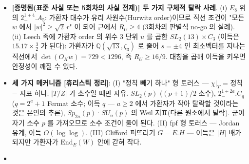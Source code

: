 \begin{itemize}
  \textbf{{[}계산{]} GAP 지표표 라이브러리 스캔} (중복을 뺀 2320개 표 가운데 2313개; 류가 1200개를 넘는 7개 --- \(2.O_8^+(7)\), \(O_{12}^-(3)\), \(U_6(4)\), \(2_1.O_{12}^+(3)\) 과 큰 2-국소군 셋 --- 는 제외). 이득이 1 이상인 충실한 기약 지표마다 Galois 켤레의 합을 만들어 증명된 조건만 시험했다: (R1) 소수 위수 류가 자유 또는 정칙; (R2)·(R3) 따름정리의 두 경우에서 대각합 0. 결과: (R1) 통과 181쌍(모두 자유 류가 Sylow 중심 --- 보조정리 (2) 의 점검), (R1)--(R3) 통과 117쌍. 모두 통과하고 이득 1.9 이상인 25쌍: \(SL_2(13)\) 과 \(2.L_2(13).2\) (15.17); \(SL_2(5)\) 와 그 친척 다섯 (7.5); \(N(2.HS,Q_8)\) 유형 (3.75); \(3\times SL_2(7)\), \((SL_2(3)\times7{:}3).2\) (3.5); \(2.(13{:}6\times A_4).2\) (3.25); \(SL_2(3)\), \(2.S_4\) 유형 (3); \(SL_2(7)\) (2.33); \(SL_2(31)\) (2.07). \textbf{icosian 값 7.5 를 넘는 것은 \(SL_2(13)\) 뿐이다.} (R1) 만 통과하는 큰 이득의 후보는 모두 (R3) 에서(제곱이 정칙인데 대각합이 0 이 아닌 위수 4 의 류) 탈락한다: \(2^{1+4}_-.A_5\) 와 \(4\circ2^{1+4}.A_5\) (\(E_8\) 위, 이득 60), \(2.2^4.2^4.S_3\) (24, 실수형), \(2.U_4(2)N2\) (12), \(2(L_2(7)\times4).2\) (9.3) 등. \(2.L_2(17)\), \(2.L_2(25)\), \(2.L_2(29)\), \(2.J_2\), \(2.G_2(4)\), \(6.Suz\), \(2.Co_1\), \(2.A_7\), \(6.A_7\), \(6.L_3(4)\), \(6_1.U_4(3)\), \(Sz(8)\), \(Sz(32)\), \(U_3(q)\), \(S_4(q)\) 등은 (R1) 에서 이미 탈락한다.
\item
  \textbf{{[}증명됨(표준 사실 또는 5회차의 사실 전제){]} 두 가지 구체적 탈락 사례}. (i) \(E_8\) 위의 \(2^{1+4}_-.A_5\): 가환자 대수가 유리 사원수(Hurwitz order)이므로 직선 조건이 "모든 \(w\) 에서 \(|w|^2\ge\sqrt2\,r\)" 이 되어 근에서 \(R_U\ge4\) (3회차의 판별식 no-go 의 실례). (ii) Leech 족에 가환자 order 의 위수 3 단위 \(u\) 를 곱한 \(SL_2(13)\times C_3\) (이득은 \(15.17\times\tfrac32\) 가 된다): 가환자가 \(\mathbb Q(\sqrt{13},\zeta_3)\) 로 줄어 \(s=\pm4\) 인 최소벡터를 지나는 직선에서 \(\det(O_Kw)=729<1296\), 즉 \(R_U\ge16/9\). 대칭을 곱해 이득을 키우면 안정성이 깨질 수 있다.
\item
  \textbf{세 가지 메커니즘 {[}휴리스틱 정리{]}}: (I) "정칙 빼기 하나" 형 토러스 --- \(\chi|_T\) = 정칙 \(-\) 지표 하나; \(|T/Z|\) 가 소수일 때만 자유. \(SL_2(p)\) (\((p+1)/2\) 소수), \(2^{1+2a}_-.C_q\) (\(q=2^a+1\) Fermat 소수; 이득 \(q\) --- \(a\ge2\) 에서 가환자가 작아 탈락할 것이라는 것은 본인의 추론), \(Sp_{2n}(p)\)·\(SU_n(p)\) 의 Weil 지표(다른 원소에서 탈락). 군이 자기 소수 \(p\) 를 가져오므로 소수 조건이 둘이 된다. (II) fpf 형 토러스 --- Jordan 유계, 이득 \(O(\log\log)\). (III) Clifford 퍼뜨리기 \(G=E.H\) --- 이득은 \(|H|\) 배가 되지만 가환자가 \(\mathrm{End}_E(W)\) 안에 갇혀 작다.
\item

\end{itemize}
